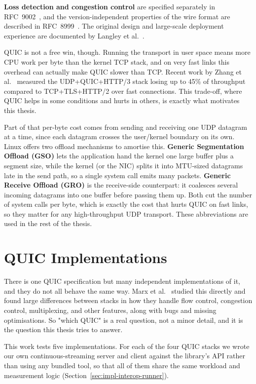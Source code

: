 \textbf{Loss detection and congestion control} are specified separately in
RFC~9002~\cite{rfc9002}, and the version-independent properties of the wire
format are described in RFC~8999~\cite{rfc8999}. The original design and
large-scale deployment experience are documented by Langley et
al.~\cite{langley2017quic}.

QUIC is not a free win, though. Running the transport in user space means more
CPU work per byte than the kernel TCP stack, and on very fast links this
overhead can actually make QUIC slower than TCP. Recent work by Zhang et
al.~\cite{zhang2024quic} measured the UDP+QUIC+HTTP/3 stack losing up to
45\% of throughput compared to TCP+TLS+HTTP/2 over fast connections. This
trade-off, where QUIC helps in some conditions and hurts in others, is exactly
what motivates this thesis.

Part of that per-byte cost comes from sending and receiving one UDP datagram at
a time, since each datagram crosses the user/kernel boundary on its own. Linux
offers two offload mechanisms to amortise this. \textbf{Generic Segmentation
Offload (GSO)} lets the application hand the kernel one large buffer plus a
segment size, while the kernel (or the NIC) splits it into MTU-sized datagrams late
in the send path, so a single system call emits many packets. \textbf{Generic
Receive Offload (GRO)} is the receive-side counterpart: it coalesces several
incoming datagrams into one buffer before passing them up. Both cut the number
of system calls per byte, which is exactly the cost that hurts QUIC on fast
links, so they matter for any high-throughput UDP transport. These
abbreviations are used in the rest of the thesis.

\section{QUIC Implementations}
\label{sec:bg-implementations}

There is one QUIC specification but many independent implementations of it,
and they do not all behave the same way. Marx et al.~\cite{marx2020same}
studied this directly and found large differences between stacks in how they
handle flow control, congestion control, multiplexing, and other features,
along with bugs and missing optimisations. So "which QUIC" is a real question,
not a minor detail, and it is the question this thesis tries to answer.

This work tests five implementations. For each of the four QUIC stacks we wrote
our own continuous-streaming server and client against the library's API rather
than using any bundled tool, so that all of them share the same workload and
measurement logic (Section~\ref{sec:impl-interop-runner}).

